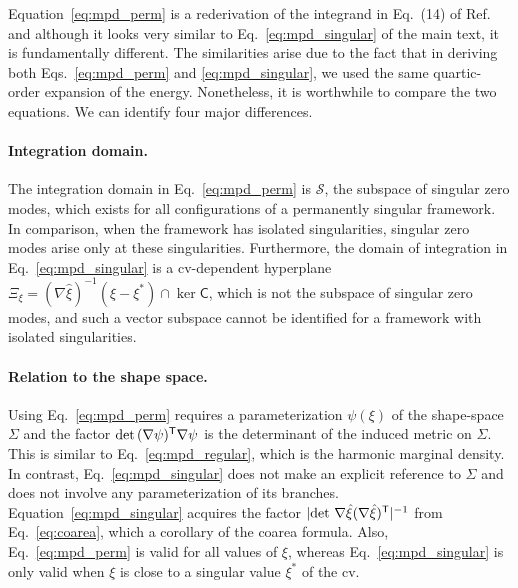 Equation~\eqref{eq:mpd_perm} is a rederivation of the integrand in Eq.~(14) of Ref.~\cite{kallus2017} and although it looks very similar to Eq.~\eqref{eq:mpd_singular} of the main text, it is fundamentally different.
The similarities arise due to the fact that in deriving both Eqs.~\eqref{eq:mpd_perm} and \eqref{eq:mpd_singular}, we used the same quartic-order expansion of the energy.
Nonetheless, it is worthwhile to compare the two equations.
We can identify four major differences.

\paragraph{Integration domain.}
The integration domain in Eq.~\eqref{eq:mpd_perm} is $\mathscr{S}$, the subspace of singular zero modes, which exists for all configurations of a permanently singular framework.
In comparison, when the framework has isolated singularities, singular zero modes arise only at these singularities.
Furthermore, the domain of integration in Eq.~\eqref{eq:mpd_singular} is a \ac{cv}-dependent hyperplane $\Xi_{\xi} = (\nabla\hat{\xi})^{-1}(\xi - \xi^{*}) \cap \ker\mathsf{C}$, which is not the subspace of singular zero modes, and such a vector subspace cannot be identified for a framework with isolated singularities.

\paragraph{Relation to the shape space.}
Using Eq.~\eqref{eq:mpd_perm} requires a parameterization $\psi(\xi)$ of the shape-space $\Sigma$ and the factor $\det\,(\nabla\psi)^\mathsf{T}\nabla\psi$ is the determinant of the induced metric on $\Sigma$.
This is similar to Eq.~\eqref{eq:mpd_regular}, which is the harmonic marginal density.
In contrast, Eq.~\eqref{eq:mpd_singular} does not make an explicit reference to $\Sigma$ and does not involve any parameterization of its branches.
Equation~\eqref{eq:mpd_singular} acquires the factor $\lvert\det\,{\nabla\hat{\xi}}(\nabla\hat{\xi})^\mathsf{T}\rvert^{-1}$ from Eq.~\eqref{eq:coarea}, which a corollary of the coarea formula.
Also, Eq.~\eqref{eq:mpd_perm} is valid for all values of $\xi$, whereas Eq.~\eqref{eq:mpd_singular} is only valid when $\xi$ is close to a singular value $\xi^{*}$ of the \ac{cv}.

